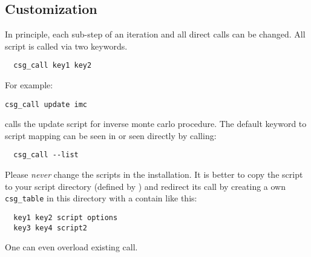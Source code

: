 \subsection{Customization}
In principle, each sub-step of an iteration and all direct calls can be changed. 
All script is called via two keywords.
\begin{verbatim}
  csg_call key1 key2
\end{verbatim} 
For example:
\begin{verbatim}
csg_call update imc
\end{verbatim} 
calls the update script for inverse monte carlo procedure.
The default keyword to script mapping can be seen in  or seen directly by calling:
\begin{verbatim}
  csg_call --list
\end{verbatim} 

Please {\em never} change the scripts in the \votca installation. It is better to copy the script to your script directory (defined by ) and redirect its call by creating a own \texttt{csg\_table} in this directory with a contain like this:
\begin{verbatim}
  key1 key2 script options
  key3 key4 script2
\end{verbatim} 
One can even overload existing call.
